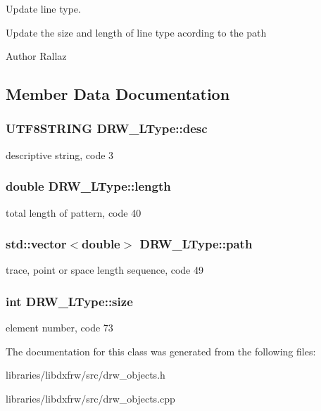 Update line type. 

Update the size and length of line type acording to the path \begin{DoxyAuthor}{Author}
Rallaz 
\end{DoxyAuthor}


\subsection{Member Data Documentation}
\hypertarget{classDRW__LType_ae6f6458c8c9ac100908259558c7e22d2}{
\subsubsection[{desc}]{\setlength{\rightskip}{0pt plus 5cm}U\-T\-F8\-S\-T\-R\-I\-N\-G D\-R\-W\-\_\-\-L\-Type\-::desc}}\label{classDRW__LType_ae6f6458c8c9ac100908259558c7e22d2}
descriptive string, code 3 \hypertarget{classDRW__LType_a438510524566f0deaf77ea694f171762}{
\subsubsection[{length}]{\setlength{\rightskip}{0pt plus 5cm}double D\-R\-W\-\_\-\-L\-Type\-::length}}\label{classDRW__LType_a438510524566f0deaf77ea694f171762}
total length of pattern, code 40 \hypertarget{classDRW__LType_afb0702d3edab2948fdba2fb861fd3a4b}{
\subsubsection[{path}]{\setlength{\rightskip}{0pt plus 5cm}std\-::vector$<$double$>$ D\-R\-W\-\_\-\-L\-Type\-::path}}\label{classDRW__LType_afb0702d3edab2948fdba2fb861fd3a4b}
trace, point or space length sequence, code 49 \hypertarget{classDRW__LType_acb78cd0a105ac8b44e19313a4bf90f50}{
\subsubsection[{size}]{\setlength{\rightskip}{0pt plus 5cm}int D\-R\-W\-\_\-\-L\-Type\-::size}}\label{classDRW__LType_acb78cd0a105ac8b44e19313a4bf90f50}
element number, code 73 

The documentation for this class was generated from the following files\-:\begin{DoxyCompactItemize}
\item 
libraries/libdxfrw/src/drw\-\_\-objects.\-h\item 
libraries/libdxfrw/src/drw\-\_\-objects.\-cpp\end{DoxyCompactItemize}
